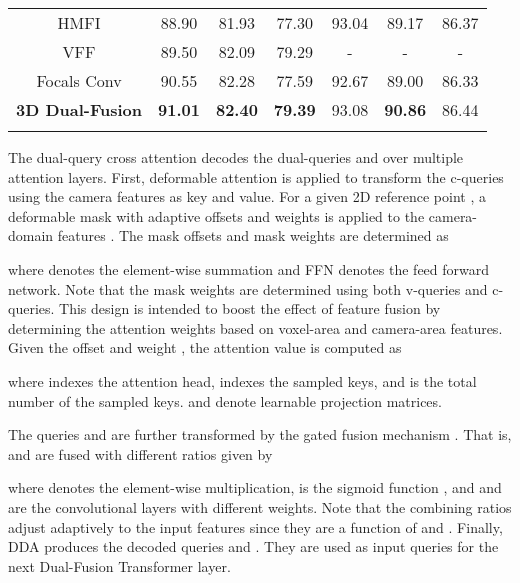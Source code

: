 \documentclass[lettersize,journal]{IEEEtran}
\begin{document}
\begin{table*}[t]
\begin{tabular}{ccccccc}
HMFI\cite{hmfi} & 88.90 & 81.93 & 77.30 & 93.04 & 89.17 & 86.37 \\
VFF\cite{vff}           & 89.50    & 82.09                & 79.29    &   -       &   -                  &   -      \\
Focals Conv\cite{focalsconv}       & 90.55    & 82.28                & 77.59    & 92.67     & 89.00                & 86.33    \\
\cline{1-7}
\textbf{3D Dual-Fusion} & \textbf{91.01}    & \textbf{82.40}       & \textbf{79.39}& 93.08& \textbf{90.86}       & 86.44\\
\cline{1-7}
\label{table:kitti_test}
\end{tabular}
\end{table*} 
 
The dual-query cross attention decodes the dual-queries  and  over multiple attention layers.
First, deformable attention is applied to transform the c-queries  using the camera features   as key and value. For a given 2D reference point , a deformable mask with adaptive offsets and weights is applied to the camera-domain features . The mask offsets  and  mask weights  are determined as

where   denotes the element-wise summation and FFN denotes the feed forward network. Note that the mask weights are determined using both v-queries and c-queries. This design is intended to boost the effect of feature fusion by determining the attention weights based on voxel-area and camera-area features.  Given the offset  and weight , the attention value  is computed as 

where  indexes the attention head,  indexes the sampled keys, and  is the total number of the sampled keys.  and  denote learnable projection matrices.

The queries  and  are further transformed by the gated fusion mechanism \cite{gatedfusion}. That is,  and  are fused with different ratios given by 

where  denotes the element-wise multiplication,   is the sigmoid function , and  and  are the convolutional layers with different weights. Note that the combining ratios adjust adaptively to the input features since they are a function of  and .  Finally, DDA produces the decoded queries  and . They are used as input queries for the next Dual-Fusion Transformer layer. 
\end{document}
